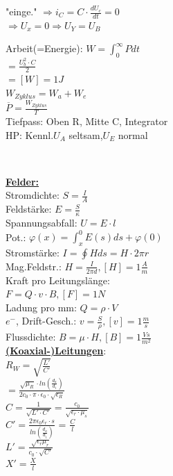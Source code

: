 \documentclass[8pt]{extarticle}
\begin{document}
\begin{minipage}{0.33\textwidth}
"einge." $\Rightarrow i_C = C \cdot \frac{dU_c}{dt} = 0$\\
\phantom{sss} $\Rightarrow U_x = 0 \Rightarrow U_Y = U_B$

Arbeit(=Energie): $W = \int_0^\infty P dt$\\
\phantom{sssssssss} $= \frac{U_b^2 \cdot C}{2} $\\
\phantom{sssssssss} $= [W] = 1J $\\
$W_{Zyklus} = W_a + W_e$\\
$\overline{P} = \frac{W_{Zyklus}}{T}$\\
Tiefpass: Oben R, Mitte C, Integrator\\
HP: Kennl.$U_A$ seltsam,$U_E$ normal
\end{minipage}%
~~~~~~~
\begin{minipage}{0.33\textwidth}

\underline{\textbf{Felder:}}\\
Stromdichte: $S=\frac{I}{A}$\\
Feldstärke: $E=\frac{S}{\kappa}$\\
Spannungsabfall: $U=E \cdot l$\\
Pot.: $\varphi (x)= \int_x^0 E(s)ds + \varphi(0)$\\
Stromstärke: $I = \oint H ds = H \cdot 2\pi r$\\
Mag.Feldstr.: $H = \frac{I}{2\pi d}, [H] = 1\frac{A}{m}$\\
Kraft pro Leitungslänge:\\
\phantom{ss} $F=Q \cdot v \cdot B, [F] = 1N$\\
Ladung pro mm: $Q = \rho \cdot V$\\
$e^-$, Drift-Gesch.: $v = \frac{S}{\rho}, [v] = 1\frac{m}{s}$\\
Flussdichte: $B=\mu \cdot H, [B] = 1 \frac{Vs}{m^2}$\\
 
 \underline{\textbf{(Koaxial-)Leitungen}}:\\
$R_W = \sqrt{\frac{L'}{C'}}$\\
    \phantom{sssi} $=\frac{\sqrt{\mu_R} \cdot ln(\frac{d_a}{d_i})}{2c_0 \cdot \pi \cdot \epsilon_0 \cdot \sqrt{\epsilon_R}}$\\
$C = \frac{1}{\sqrt{L' \cdot C'}} = \frac{c_0}{\sqrt{\epsilon_r \cdot \mu_s}}$\\
$C' = \frac{2\pi \epsilon_0 \epsilon_r \cdot s}{ln(\frac{d_a}{d_i})}$ = $\frac{C}{l}$\\
$L' = \frac{\sqrt{\epsilon_r \mu_r}}{c_0 \cdot \sqrt{C'}}$\\
$X' = \frac{X}{l}$\\


\end{minipage}
\end{document}

